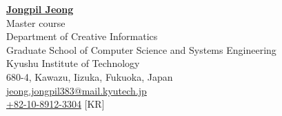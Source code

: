 \documentclass[a4paper,9pt]{extarticle}
\begin{document}
\pagestyle{fancy}
\renewcommand{\headrulewidth}{0pt}
\fancyhead{}
\thispagestyle{empty} %

\begin{flushleft}
\href{https://scholar.google.com/citations?user=O-3pYeQAAAAJ&hl=en}{\textbf{\LARGE Jongpil Jeong}}\\[2pt] %
Master course \\ 
Department of Creative Informatics \\ 
Graduate School of Computer Science and Systems Engineering \\ 
Kyushu Institute of Technology \\ 
680-4, Kawazu, Iizuka, Fukuoka, Japan \\ 
\href{mailto:jeong.jongpil383@mail.kyutech.jp}{jeong.jongpil383@mail.kyutech.jp} \\%
\href{tel:+82-10-8912-3304}{+82-10-8912-3304} [KR]
\end{flushleft} 



\end{document}
